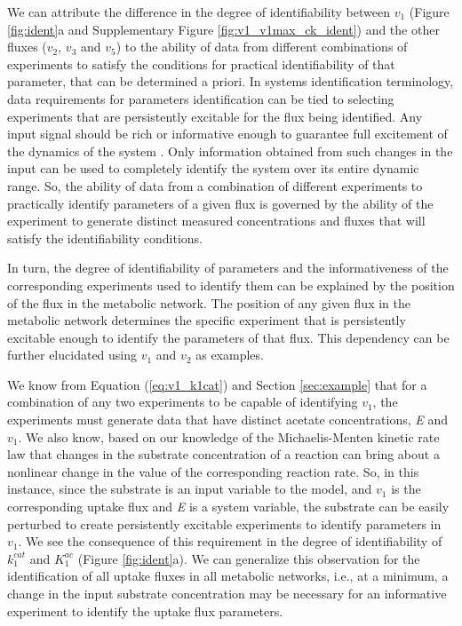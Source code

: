 \documentclass[10pt]{article}
\begin{document}
	We can attribute the difference in the degree of identifiability between $v_1$ (Figure \ref{fig:ident}a and Supplementary Figure \ref{fig:v1_v1max_ck_ident}) and the other fluxes ($v_2$, $v_3$ and $v_5$) to the ability of data from different combinations of experiments to satisfy the conditions for practical identifiability of that parameter, that can be determined a priori. In systems identification terminology, data requirements for parameters identification can be tied to selecting experiments that are persistently excitable for the flux being identified. Any input signal should be rich or informative enough to guarantee full excitement of the dynamics of the system \parencite{Ljung1994}. Only information obtained from such changes in the input can be used to completely identify the system over its entire dynamic range. So, the ability of data from a combination of different experiments to practically identify parameters of a given flux is governed by the ability of the experiment to generate distinct measured concentrations and fluxes that will satisfy the identifiability conditions. 	
	
	In turn, the degree of identifiability of parameters and the informativeness of the corresponding experiments used to identify them can be explained by the position of the flux in the metabolic network. The position of any given flux in the metabolic network determines the specific experiment that is persistently excitable enough to identify the parameters of that flux. This dependency can be further elucidated using $v_1$ and $v_2$ as examples. 
	
	We know from Equation (\ref{eq:v1_k1cat}) and Section \ref{sec:example} that for a combination of any two experiments to be capable of identifying $v_1$, the experiments must generate data that have distinct acetate concentrations, \textit{E} and $v_1$. We also know, based on our knowledge of the Michaelis-Menten kinetic rate law that changes in the substrate concentration of a reaction can bring about a nonlinear change in the value of the corresponding reaction rate. So, in this instance, since the substrate is an input variable to the model, and $v_1$ is the corresponding uptake flux and \textit{E} is a system variable, the substrate can be easily perturbed to create persistently excitable experiments to identify parameters in $v_1$. We see the consequence of this requirement in the degree of identifiability of $k_1^{cat}$ and $K_1^{ac}$ (Figure \ref{fig:ident}a). We can generalize this observation for the identification of all uptake fluxes in all metabolic networks, i.e., at a minimum, a change in the input substrate concentration may be necessary for an informative experiment to identify the uptake flux parameters. 
	
\end{document}
